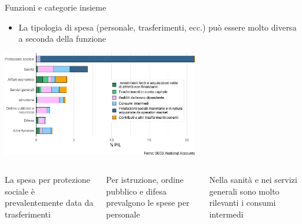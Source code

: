 \documentclass[aspectratio=64,11pt]{beamer}
\begin{document}
\begin{frame}{Funzioni e categorie insieme}
\begin{itemize}
\item La tipologia di spesa (personale, trasferimenti, ecc.) può essere molto diversa a seconda della funzione
\end{itemize}

\begin{center}
\includegraphics[height=4.6cm]{./figure/spesa-primaria-funzioni-categorie-ITA-color.pdf}
\end{center}

\begin{columns}
\begin{column}{.33\columnwidth}
\begin{block}{}
\footnotesize
La spesa per protezione sociale è prevalentemente data da trasferimenti
\end{block}
\end{column}

\begin{column}{.33\columnwidth}
\begin{block}{}
\footnotesize
Per istruzione, ordine pubblico e difesa prevalgono le spese per personale
\end{block}
\end{column}

\begin{column}{.33\columnwidth}
\begin{block}{}
\footnotesize
Nella sanità e nei servizi generali sono molto rilevanti i consumi intermedi
\end{block}
\end{column}
\end{columns}
\end{frame}
\end{document}
